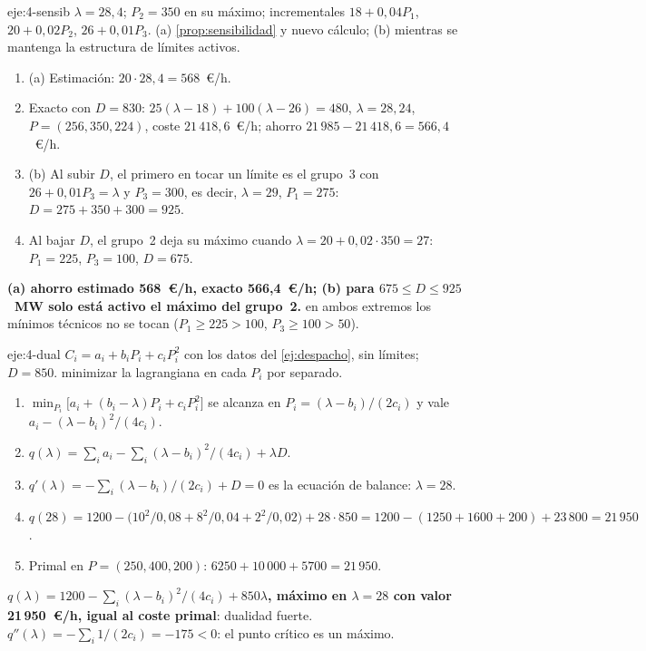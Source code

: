 \begin{solucion}{eje:4-sensib}
\datos $\lambda=28{,}4$; $P_2=350$ en su máximo; incrementales $18+0{,}04P_1$, $20+0{,}02P_2$, $26+0{,}01P_3$.
\planteamiento (a) \cref{prop:sensibilidad} y nuevo cálculo; (b) mientras se mantenga la estructura de límites activos.
\pasos
\begin{enumerate}[label=\arabic*.]
  \item (a) Estimación: $20\cdot 28{,}4=568$~€/h.
  \item Exacto con $D=830$: $25(\lambda-18)+100(\lambda-26)=480$, $\lambda=28{,}24$, $P=(256,350,224)$, coste $21\,418{,}6$~€/h; ahorro $21\,985-21\,418{,}6=566{,}4$~€/h.
  \item (b) Al subir $D$, el primero en tocar un límite es el grupo~3 con $26+0{,}01P_3=\lambda$ y $P_3=300$, es decir, $\lambda=29$, $P_1=275$: $D=275+350+300=925$.
  \item Al bajar $D$, el grupo~2 deja su máximo cuando $\lambda=20+0{,}02\cdot 350=27$: $P_1=225$, $P_3=100$, $D=675$.
\end{enumerate}
\resultado \textbf{(a) ahorro estimado 568~€/h, exacto 566,4~€/h; (b) para $675\le D\le 925$~MW solo está activo el máximo del grupo~2.}
\comprobacion en ambos extremos los mínimos técnicos no se tocan ($P_1\ge 225>100$, $P_3\ge 100>50$).
\end{solucion}

\begin{solucion}{eje:4-dual}
\datos $C_i=a_i+b_iP_i+c_iP_i^{2}$ con los datos del \cref{ej:despacho}, sin límites; $D=850$.
\planteamiento minimizar la lagrangiana en cada $P_i$ por separado.
\pasos
\begin{enumerate}[label=\arabic*.]
  \item $\min_{P_i}\bigl[a_i+(b_i-\lambda)P_i+c_iP_i^{2}\bigr]$ se alcanza en $P_i=(\lambda-b_i)/(2c_i)$ y vale $a_i-(\lambda-b_i)^{2}/(4c_i)$.
  \item $q(\lambda)=\sum_ia_i-\sum_i(\lambda-b_i)^{2}/(4c_i)+\lambda D$.
  \item $q'(\lambda)=-\sum_i(\lambda-b_i)/(2c_i)+D=0$ es la ecuación de balance: $\lambda=28$.
  \item $q(28)=1200-\bigl(10^{2}/0{,}08+8^{2}/0{,}04+2^{2}/0{,}02\bigr)+28\cdot 850=1200-(1250+1600+200)+23\,800=21\,950$.
  \item Primal en $P=(250,400,200)$: $6250+10\,000+5700=21\,950$.
\end{enumerate}
\resultado \textbf{$q(\lambda)=1200-\sum_i(\lambda-b_i)^{2}/(4c_i)+850\lambda$, máximo en $\lambda=28$ con valor 21\,950~€/h, igual al coste primal}: dualidad fuerte.
\comprobacion $q''(\lambda)=-\sum_i1/(2c_i)=-175<0$: el punto crítico es un máximo.
\end{solucion}

